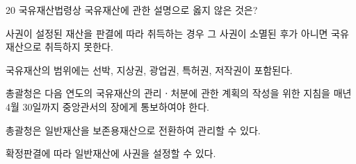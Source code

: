 \begin{question}{20}
국유재산법령상 국유재산에 관한 설명으로 옳지 않은 것은?
\begin{choices}
  \item 사권이 설정된 재산을 판결에 따라 취득하는 경우 그 사권이 소멸된 후가 아니면 국유재산으로 취득하지 못한다.
  \item 국유재산의 범위에는 선박, 지상권, 광업권, 특허권, 저작권이 포함된다.
  \item 총괄청은 다음 연도의 국유재산의 관리ㆍ처분에 관한 계획의 작성을 위한 지침을 매년 4월 30일까지 중앙관서의 장에게 통보하여야 한다.
  \item 총괄청은 일반재산을 보존용재산으로 전환하여 관리할 수 있다.
  \item 확정판결에 따라 일반재산에 사권을 설정할 수 있다.
\end{choices}
\end{question}
